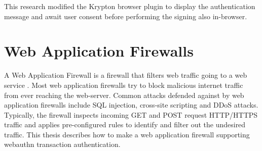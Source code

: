 This research modified the Krypton browser plugin to display the authentication message and await user consent before performing the signing also in-browser.


\section{Web Application Firewalls}

A Web Application Firewall is a firewall that filters web traffic going to a web service \cite{https://cybersecurity.att.com/blogs/security-essentials/explain-how-a-web-application-firewall-works}. Most web application firewalls try to block malicious internet traffic from ever reaching the web-server. Common attacks defended against by web application firewalls include SQL injection, cross-site scripting and DDoS attacks. Typically, the firewall inspects incoming GET and POST request HTTP/HTTPS traffic and applies pre-configured rules to identify and filter out the undesired traffic. This thesis describes how to make a web application firewall supporting webauthn transaction authentication.






